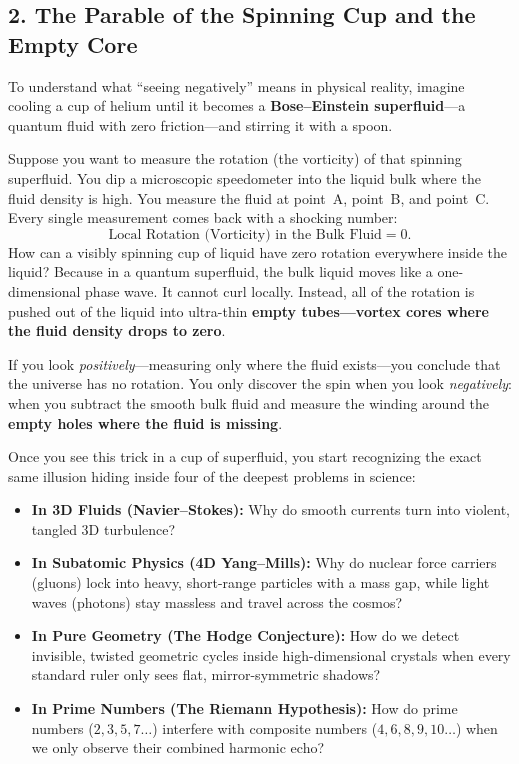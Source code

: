 \documentclass[11pt,a4paper]{article}
\begin{document}
\subsection*{2. The Parable of the Spinning Cup and the Empty Core}

To understand what ``seeing negatively'' means in physical reality, imagine cooling a cup of helium until it becomes a \textbf{Bose--Einstein superfluid}---a quantum fluid with zero friction---and stirring it with a spoon.

Suppose you want to measure the rotation (the vorticity) of that spinning superfluid. You dip a microscopic speedometer into the liquid bulk where the fluid density is high. You measure the fluid at point~A, point~B, and point~C. Every single measurement comes back with a shocking number:
\[
  \text{Local Rotation (Vorticity) in the Bulk Fluid} = 0.
\]
How can a visibly spinning cup of liquid have zero rotation everywhere inside the liquid? Because in a quantum superfluid, the bulk liquid moves like a one-dimensional phase wave. It cannot curl locally. Instead, all of the rotation is pushed out of the liquid into ultra-thin \textbf{empty tubes---vortex cores where the fluid density drops to zero}.

If you look \emph{positively}---measuring only where the fluid exists---you conclude that the universe has no rotation. You only discover the spin when you look \emph{negatively}: when you subtract the smooth bulk fluid and measure the winding around the \textbf{empty holes where the fluid is missing}.

Once you see this trick in a cup of superfluid, you start recognizing the exact same illusion hiding inside four of the deepest problems in science:
\begin{itemize}
  \item \textbf{In 3D Fluids (Navier--Stokes):} Why do smooth currents turn into violent, tangled 3D turbulence?
  \item \textbf{In Subatomic Physics (4D Yang--Mills):} Why do nuclear force carriers (gluons) lock into heavy, short-range particles with a mass gap, while light waves (photons) stay massless and travel across the cosmos?
  \item \textbf{In Pure Geometry (The Hodge Conjecture):} How do we detect invisible, twisted geometric cycles inside high-dimensional crystals when every standard ruler only sees flat, mirror-symmetric shadows?
  \item \textbf{In Prime Numbers (The Riemann Hypothesis):} How do prime numbers ($2, 3, 5, 7\dots$) interfere with composite numbers ($4, 6, 8, 9, 10\dots$) when we only observe their combined harmonic echo?
\end{itemize}
\end{document}
